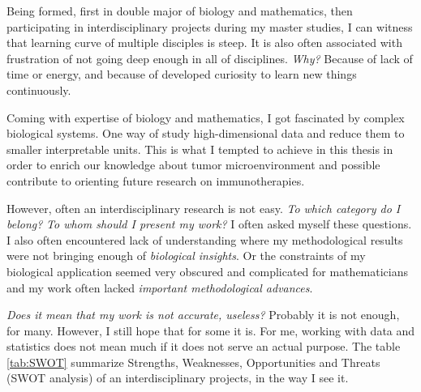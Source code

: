 \documentclass[12pt,]{book}
\theoremstyle{definition}
\theoremstyle{definition}
\theoremstyle{definition}
\theoremstyle{remark}
\begin{document}
Being formed, first in double major of biology and mathematics, then
participating in interdisciplinary projects during my master studies, I
can witness that learning curve of multiple disciples is steep. It is
also often associated with frustration of not going deep enough in all
of disciplines. \emph{Why?} Because of lack of time or energy, and
because of developed curiosity to learn new things continuously.

Coming with expertise of biology and mathematics, I got fascinated by
complex biological systems. One way of study high-dimensional data and
reduce them to smaller interpretable units. This is what I tempted to
achieve in this thesis in order to enrich our knowledge about tumor
microenvironment and possible contribute to orienting future research on
immunotherapies.

However, often an interdisciplinary research is not easy. \emph{To which
category do I belong?} \emph{To whom should I present my work?} I often
asked myself these questions. I also often encountered lack of
understanding where my methodological results were not bringing enough
of \emph{biological insights}. Or the constraints of my biological
application seemed very obscured and complicated for mathematicians and
my work often lacked \emph{important methodological advances}.

\emph{Does it mean that my work is not accurate, useless?} Probably it
is not enough, for many. However, I still hope that for some it is. For
me, working with data and statistics does not mean much if it does not
serve an actual purpose. The table \ref{tab:SWOT} summarize Strengths,
Weaknesses, Opportunities and Threats (SWOT analysis) of an
interdisciplinary projects, in the way I see it.
\end{document}
